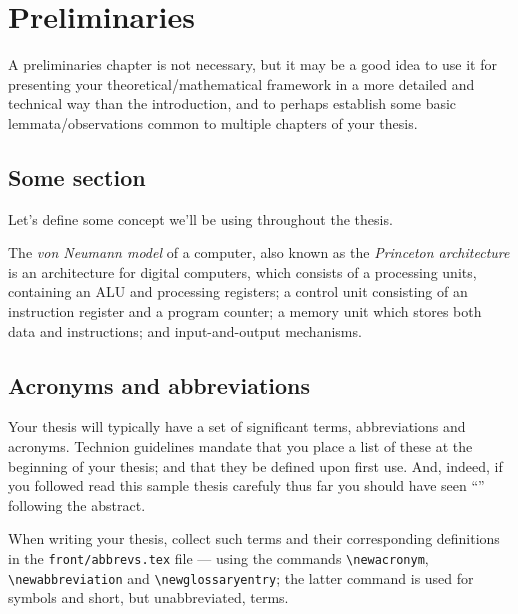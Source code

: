 \chapter{Preliminaries}
\label{chap:prelims}

A preliminaries chapter is not necessary, but it may be a good idea to use it for presenting your theoretical/mathematical framework in a more detailed and technical way than the introduction, and to perhaps establish some basic lemmata/observations common to multiple chapters of your thesis.

\section{Some section}

Let's define some concept we'll be using throughout the thesis.

\begin{definition}
The \emph{von Neumann model} of a computer, also known as the \emph{Princeton architecture} is an architecture for digital computers, which consists of a processing units, containing an ALU and processing registers; a control unit consisting of an instruction register and a program counter; a memory unit which stores both data and instructions; and input-and-output mechanisms.
\end{definition}

\section{Acronyms and abbreviations}

Your thesis will typically have a set of significant terms, abbreviations and acronyms. Technion guidelines mandate that you place a list of these at the beginning of your thesis; and that they be defined upon first use. And, indeed, if you followed read this sample thesis carefuly thus far you should have seen ``'' following the abstract.

When writing your thesis, collect such terms and their corresponding definitions in the \texttt{front/abbrevs.tex} file --- using the commands \verb|\newacronym|,  \verb|\newabbreviation| and \verb|\newglossaryentry|; the latter command is used for symbols and short, but unabbreviated, terms.

